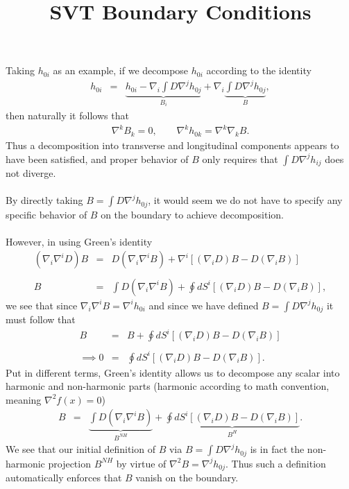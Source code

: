 \documentclass[10pt,letterpaper]{article}
\title{SVT Boundary Conditions}
\date{}
\numberwithin{equation}{section}
\begin{document}
 
\maketitle
\noindent 

Taking $h_{0i}$ as an example, if we decompose $h_{0i}$ according to the identity
\begin{eqnarray}
h_{0i} &=& \underbrace{ h_{0i} - \nabla_i \int D \nabla^j h_{0j}}_{B_i} + \nabla_i\underbrace{  \int D \nabla^j h_{0j}}_{B},
\end{eqnarray}
then naturally it follows that
\begin{eqnarray}
\nabla^k B_k = 0,\qquad \nabla^k h_{0k} = \nabla^k \nabla_k B.
\end{eqnarray}
Thus a decomposition into transverse and longitudinal components appears to have been satisfied, and proper behavior of $B$ only requires that $\int D \nabla^j h_{ij}$ does not diverge. \\ \\
By directly taking $B= \int D \nabla^j h_{0j}$, it would seem we do not have to specify any specific behavior of $B$ on the boundary to achieve decomposition.
\\ \\
However, in using Green's identity
\begin{eqnarray}
(\nabla_i\nabla^i D)B &=& D(\nabla_i\nabla^i B) + \nabla^i[ (\nabla_i D)B - D(\nabla_i B)]
\\ \nonumber\\
B &=& \int D(\nabla_i\nabla^i B) + \oint dS^i [ (\nabla_i D)B - D(\nabla_i B)],
\end{eqnarray}
we see that since $\nabla_i \nabla^i B = \nabla^i h_{0i}$ and since we have defined $B=\int D \nabla^j h_{0j}$ it must follow that
\begin{eqnarray}
B &=& B + \oint dS^i [ (\nabla_i D)B - D(\nabla_i B)]
\\ \nonumber\\
\implies 0&=& \oint dS^i [ (\nabla_i D)B - D(\nabla_i B)].
\end{eqnarray}
Put in different terms, Green's identity allows us to decompose any scalar into harmonic and non-harmonic parts (harmonic according to math convention, meaning $\nabla^2 f(x) = 0$)
\begin{eqnarray}
B &=& \underbrace{\int D(\nabla_i\nabla^i B)}_{B^{NH}} + \underbrace{\oint dS^i [ (\nabla_i D)B - D(\nabla_i B)]}_{B^H}.
\end{eqnarray} 
We see that our initial definition of $B$ via $B=\int D \nabla^j h_{0j}$ is in fact the non-harmonic projection $B^{NH}$ by virtue of $\nabla^2 B = \nabla^j h_{0j}$. Thus such a definition automatically enforces that $B$ vanish on the boundary. 
\end{document}
